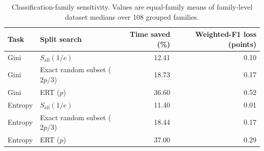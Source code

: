 \begin{table}[t]
\centering
\small
\caption{Classification-family sensitivity. Values are equal-family means of family-level dataset medians over 108 grouped families.}
\label{tab:supp_class_family}
\begin{tabular}{llrr}
\toprule
Task & Split search & Time saved (\%) & Weighted-F1 loss (points) \\
\midrule
Gini & $S_{\mathrm{all}}(1/e)$ & 12.41 & 0.10 \\
Gini & Exact random subset ($2p/3$) & 18.73 & 0.17 \\
Gini & ERT ($p$) & 36.60 & 0.52 \\
Entropy & $S_{\mathrm{all}}(1/e)$ & 11.40 & 0.01 \\
Entropy & Exact random subset ($2p/3$) & 18.44 & 0.17 \\
Entropy & ERT ($p$) & 37.00 & 0.29 \\
\bottomrule
\end{tabular}
\end{table}
